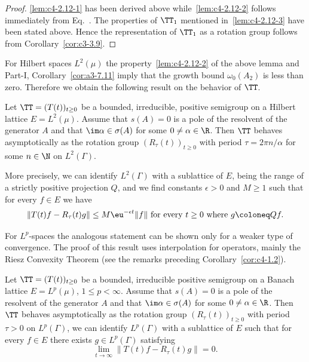 \begin{proof}
\ref{lem:c4-2.12-1} has been derived above while~\ref{lem:c4-2.12-2} follows immediately from Eq.~.
The properties of\/ $\TT_{1}$ mentioned in~\ref{lem:c4-2.12-3} have been stated above.
Hence the representation of\/ $\TT_{1}$ as a rotation group follows from Corollary~\ref{cor:c3-3.9}.
\end{proof}
For Hilbert spaces $L^{2}(\mu)$ the property~\ref{lem:c4-2.12-2} of the above lemma and Part-I, Corollary~\ref{cor:a3-7.11} imply that the growth bound $\omega_{0}(A_{2})$ is less than zero.
Therefore we obtain the following result on the behavior of\/ $\TT$.
\begin{proposition}\label{prop:c4-2.13}
Let $\TT = (T(t))_{t\geq 0}$ be a bounded, irreducible, positive semigroup on a Hilbert lattice $E = L^{2}(\mu)$.
Assume that $s(A) = 0$ is a pole of the resolvent of the generator $A$ and that $\im\alpha \in \sigma(A)$ for some $0 \neq \alpha \in \R$.
Then $\TT$ behaves asymptotically as the rotation group $(R_{\tau}(t))_{t \geq 0}$ with period $\tau = 2\pi n/\alpha$ for some $n \in \N$ on $L^{2}(\Gamma)$.

More precisely, we can identify $L^{2}(\Gamma)$ with a sublattice of\/ $E$, being the range of a strictly positive projection $Q$, and we find constants $\epsilon > 0$ and $M \geq 1$ such that for every $f \in E$ we have
\begin{equation}\label{eq:c4-2.11}
\|T(t)f - R_{\tau}(t)g\| \leq M\eu^{-\epsilon t}\|f\| \text{ for every } t \geq 0 \text{ where } g \coloneq Qf.
\end{equation}
\end{proposition}
For $L^{p}$-spaces the analogous statement can be shown only for a weaker type of convergence.
The proof of this result uses interpolation for operators, mainly the Riesz Convexity Theorem (see the remarks preceding Corollary~\ref{cor:c4-1.2}).
\begin{theorem}\label{thm:c4-2.14}
%
%
%
Let $\TT = (T(t))_{t \geq 0}$ be a bounded, irreducible positive semigroup on a Banach lattice $E = L^{p}(\mu)$, $1 \leq p < \infty$.
Assume that $s(A) = 0$ is a pole of the resolvent of the generator $A$ and that $\im\alpha \in \sigma(A)$ for some $0 \neq \alpha \in \R$.
Then $\TT$ behaves asymptotically as the rotation group $(R_{\tau}(t))_{t \geq 0}$ with period $\tau > 0$ on $L^{p}(\Gamma)$, \ie  we can identify $L^{p}(\Gamma)$ with a sublattice of\/ $E$ such that for every $f \in E$ there exists $g \in L^{p}(\Gamma)$ satisfying
\begin{equation}\label{eq:c4-2.12}
\lim_{t \to \infty} \|T(t)f - R_{\tau}(t)g\| = 0.
\end{equation}
\end{theorem}
